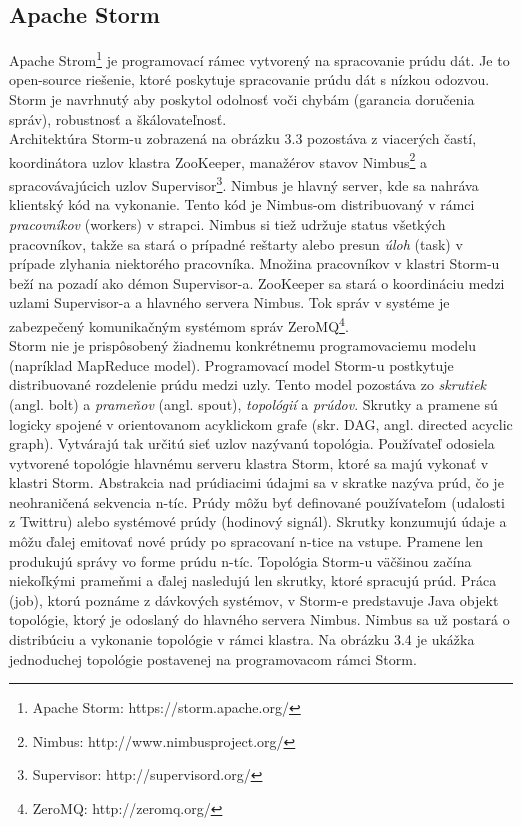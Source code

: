 \subsection{Apache Storm}
\label{existujuce-storm-subkap}
Apache Strom\footnote{Apache Storm: https://storm.apache.org/} \citep{liu2014survey, kamburugamuvesurvey} je programovací rámec vytvorený na spracovanie prúdu dát. Je to open-source riešenie, ktoré poskytuje spracovanie prúdu dát s nízkou odozvou. Storm je navrhnutý aby poskytol odolnosť voči chybám (garancia doručenia správ), robustnosť a škálovateľnosť. 
\\[5pt]
Architektúra Storm-u zobrazená na obrázku 3.3 pozostáva z viacerých častí, koordinátora uzlov klastra ZooKeeper, manažérov stavov Nimbus\footnote{Nimbus: http://www.nimbusproject.org/} a spracovávajúcich uzlov Supervisor\footnote{Supervisor: http://supervisord.org/}. Nimbus je hlavný server, kde sa nahráva klientský kód na vykonanie. Tento kód je Nimbus-om distribuovaný v rámci \textit{pracovníkov} (workers) v strapci. Nimbus si tiež udržuje status všetkých pracovníkov, takže sa stará o prípadné reštarty alebo presun \textit{úloh} (task) v prípade zlyhania niektorého pracovníka. Množina pracovníkov v klastri Storm-u beží na pozadí ako démon Supervisor-a. ZooKeeper sa stará o koordináciu medzi uzlami Supervisor-a a hlavného servera Nimbus. Tok správ v systéme je zabezpečený komunikačným systémom správ ZeroMQ\footnote{ZeroMQ: http://zeromq.org/}.
\\[5pt]
Storm nie je prispôsobený žiadnemu konkrétnemu programovaciemu modelu (napríklad MapReduce model). Programovací model Storm-u postkytuje distribuované rozdelenie prúdu medzi uzly. Tento model pozostáva zo \textit{skrutiek} (angl. bolt) a \textit{prameňov} (angl. spout), \textit{topológií} a \textit{prúdov}. Skrutky a pramene sú logicky spojené v orientovanom acyklickom grafe (skr. DAG, angl. directed acyclic graph). Vytvárajú tak určitú sieť uzlov nazývanú topológia. Používateľ odosiela vytvorené topológie hlavnému serveru klastra Storm, ktoré sa majú vykonať v klastri Storm. Abstrakcia nad prúdiacimi údajmi sa v skratke nazýva prúd, čo je neohraničená sekvencia n-tíc. Prúdy môžu byť definované používateľom (udalosti z Twittru) alebo systémové prúdy (hodinový signál). Skrutky konzumujú údaje a môžu ďalej emitovať nové prúdy po spracovaní n-tice na vstupe. Pramene len produkujú správy vo forme prúdu n-tíc. Topológia Storm-u väčšinou začína niekoľkými prameňmi a ďalej nasledujú len skrutky, ktoré spracujú prúd. Práca (job), ktorú poznáme z dávkových systémov, v Storm-e predstavuje Java objekt topológie, ktorý je odoslaný do hlavného servera Nimbus. Nimbus sa už postará o distribúciu a vykonanie topológie v rámci klastra. Na obrázku 3.4 je ukážka jednoduchej topológie postavenej na programovacom rámci Storm. 
